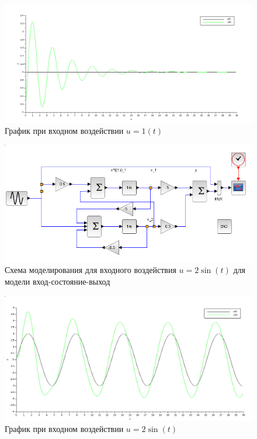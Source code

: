 \documentclass[12pt, a4paper] {ncc}
\begin{document}
		\begin{figure}[ht]
    		\includegraphics[scale=0.4]{./plotios1t.png}
			\caption{График при входном воздействии $u = 1(t)$}
		\end{figure}

		\begin{figure}[ht]
    		\includegraphics[scale=0.5]{./modeliossin.png}
			\caption{Схема моделирования для входного воздействия $u = 2\sin(t)$ для модели вход-состояние-выход}
		\end{figure}

		\begin{figure}[ht]
    		\includegraphics[scale=0.4]{./plotiossin.png}
			\caption{График при входном воздействии $u = 2\sin(t)$}
		\end{figure}
\end{document}
